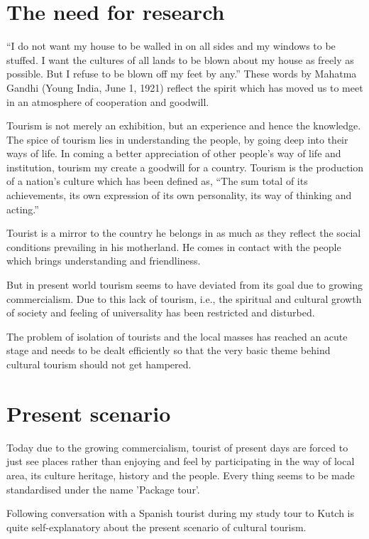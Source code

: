 \section{The need for research} %
\label{sec:nfr}

``I do not want my house to be walled in on all sides and my windows to be stuffed. I want the cultures of all lands to be blown about my house as freely as possible. But I refuse to be blown off my feet by any.'' These words by Mahatma Gandhi (Young India, June 1, 1921) reflect the spirit which has moved us to meet in an atmosphere of cooperation and goodwill.

Tourism is not merely an exhibition, but an experience and hence the knowledge. The spice of tourism lies in understanding the people, by going deep into their ways of life. In coming a better appreciation of other people's way of life and institution, tourism my create a goodwill for a country. Tourism is the production of a nation's culture which has been defined as, ``The sum total of its achievements, its own expression of its own personality, its way of thinking and acting.''

Tourist is a mirror to the country he belongs in as much as they reflect the social conditions prevailing in his motherland. He comes in contact with the people which brings understanding and friendliness.

But in present world tourism seems to have deviated from its goal due to growing commercialism. Due to this lack of tourism, i.e., the spiritual and cultural growth of society and feeling of universality has been restricted and disturbed.

The problem of isolation of tourists and the local masses has reached an acute stage and needs to be dealt efficiently so that the very basic theme behind cultural tourism should not get hampered.


\section{Present scenario} %
\label{sec:psc}

Today due to the growing commercialism, tourist of present days are forced to just see places rather than enjoying and feel by participating in the way of local area, its culture heritage, history and the people. Every thing seems to be made standardised under the name 'Package tour'.

Following conversation with a Spanish tourist during my study tour to Kutch is quite self-explanatory about the present scenario of cultural tourism.

